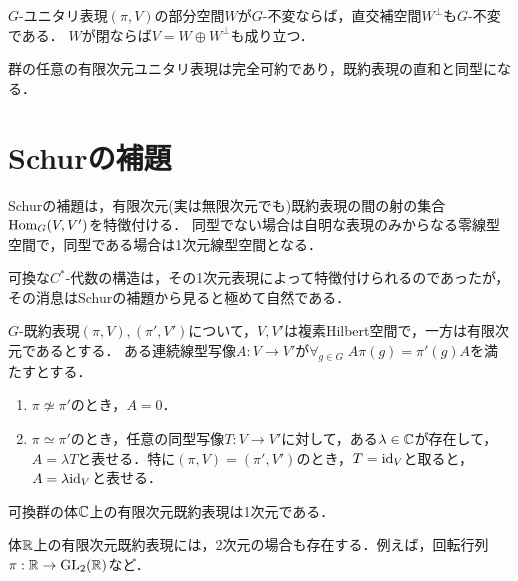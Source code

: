 \documentclass[uplatex,dvipdfmx]{jsreport}
\begin{document}
\begin{theorem}
    $G$-ユニタリ表現$(\pi,V)$の部分空間$W$が$G$-不変ならば，直交補空間$W^\perp$も$G$-不変である．
    $W$が閉ならば$V=W\oplus W^\perp$も成り立つ．
\end{theorem}

\begin{corollary}
    群の任意の有限次元ユニタリ表現は完全可約であり，既約表現の直和と同型になる．
\end{corollary}

\section{Schurの補題}

\begin{tcolorbox}[colframe=ForestGreen, colback=ForestGreen!10!white,breakable,colbacktitle=ForestGreen!40!white,coltitle=black,fonttitle=\bfseries\sffamily,
title=既約表現の間のホム集合の構造決定]
    Schurの補題は，有限次元(実は無限次元でも)既約表現の間の射の集合$\mathrm{Hom}_G(V,V')$を特徴付ける．
    同型でない場合は自明な表現のみからなる零線型空間で，同型である場合は1次元線型空間となる．

    可換な$C^*$-代数の構造は，その1次元表現によって特徴付けられるのであったが，その消息はSchurの補題から見ると極めて自然である．
\end{tcolorbox}

\begin{theorem}
    $G$-既約表現$(\pi,V),(\pi',V')$について，$V,V'$は複素Hilbert空間で，一方は有限次元であるとする．
    ある連続線型写像$A:V\to V'$が$\forall_{g\in G}\;A\pi(g)=\pi'(g)A$を満たすとする．
    \begin{enumerate}
        \item $\pi\not\simeq\pi'$のとき，$A=0$．
        \item $\pi\simeq\pi'$のとき，任意の同型写像$T:V\to V'$に対して，ある$\lambda\in\mathbb{C}$が存在して，$A=\lambda T$と表せる．特に$(\pi,V)=(\pi',V')$のとき，$T=\mathrm{id}_V$と取ると，$A=\lambda\mathrm{id}_V$と表せる．
    \end{enumerate}
\end{theorem}

\begin{corollary}
    可換群の体$\mathbb{C}$上の有限次元既約表現は1次元である．
\end{corollary}
\begin{remark}
    体$\mathbb{R}$上の有限次元既約表現には，2次元の場合も存在する．例えば，回転行列$\pi:\mathbb{R}\to\mathrm{GL}_2(\mathbb{R})$など．
\end{remark}
\end{document}
